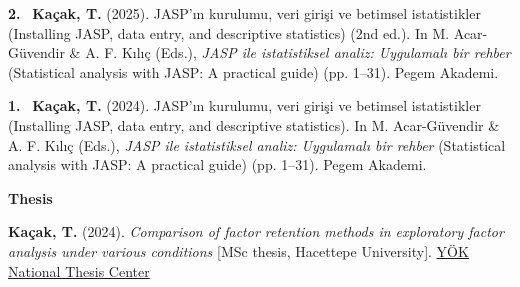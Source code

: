 \documentclass[10pt,a4paper]{article}
\newcommand{\me}[1]{\textbf{\color{headwhite}#1}}
\newcommand{\pubnum}[1]{\textbf{\color{headwhite}#1.}~}
\begin{document}
\pubnum{2} \me{Kaçak, T.} (2025). JASP'ın kurulumu, veri girişi ve betimsel istatistikler (Installing JASP, data entry, and descriptive statistics) (2nd ed.). In M. Acar-G\"uvendir \& A. F. Kılıç (Eds.), \textit{JASP ile istatistiksel analiz: Uygulamalı bir rehber} (Statistical analysis with JASP: A practical guide) (pp. 1--31). Pegem Akademi.
\vspace{6pt}

\pubnum{1} \me{Kaçak, T.} (2024). JASP'ın kurulumu, veri girişi ve betimsel istatistikler (Installing JASP, data entry, and descriptive statistics). In M. Acar-G\"uvendir \& A. F. Kılıç (Eds.), \textit{JASP ile istatistiksel analiz: Uygulamalı bir rehber} (Statistical analysis with JASP: A practical guide) (pp. 1--31). Pegem Akademi.

\vspace{10pt}
{\color{headwhite}\bfseries\normalsize Thesis}
\vspace{4pt}

\me{Kaçak, T.} (2024). \textit{Comparison of factor retention methods in exploratory factor analysis under various conditions} [MSc thesis, Hacettepe University]. \href{https://tez.yok.gov.tr/UlusalTezMerkezi/TezGoster?key=usXiZIM9Lp0wk-YzRoaT-9xjZUC9wqmxEgRujMCaa5DL9WAWPu1RCjUL04DR2bGg}{\color{linkblue}Y\"OK National Thesis Center}
\end{document}
